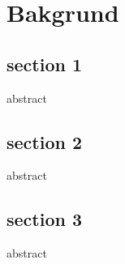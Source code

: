 \chapter{Bakgrund}

\section{section 1}
abstract
\section{section 2}
abstract
\section{section 3}
abstract